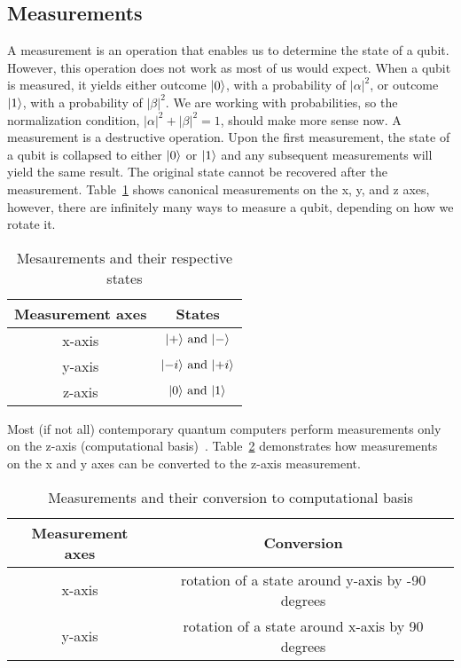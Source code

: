 \tocless\subsection{Measurements}\noindent
A measurement is an operation that enables us to determine the state of a qubit. However, this operation does not work as most of us would expect. When a qubit is measured, it yields either outcome $\lvert0\rangle$, with a probability of $\lvert \alpha \rvert^2$, or outcome $\lvert1\rangle$, with a probability of $\lvert \beta \rvert^2$. We are working with probabilities, so the normalization condition, $\lvert \alpha \rvert^2 + \lvert \beta \rvert^2 = 1$, should make more sense now. A measurement is a destructive operation. Upon the first measurement, the state of a qubit is collapsed to either $\lvert0\rangle$ or $\lvert1\rangle$ and any subsequent measurements will yield the same result. The original state cannot be recovered after the measurement. Table~\ref{tab:measurements-states} shows canonical measurements on the x, y, and z axes, however, there are infinitely many ways to measure a qubit, depending on how we rotate it.

\begin{table}[H]
  \centering
  \begin{tabular}{|c|c|} 
      \hline
      \multicolumn{1}{|c|}{\textbf{Measurement axes}} & \textbf{States}\\
      \hline
      x-axis & $\lvert+\rangle \text{ and }\lvert-\rangle$\\ 
      \hline
      y-axis & $\lvert-i\rangle \text{ and }\lvert+i\rangle$\\ 
      \hline
      z-axis & $\lvert0\rangle \text{ and }\lvert1\rangle$\\ 
      \hline
  \end{tabular}
  \caption{Mesaurements and their respective states}
  \label{tab:measurements-states}
\end{table}
Most (if not all) contemporary quantum computers perform measurements only on the z-axis (computational basis)~\cite{blog}. Table~\ref{tab:measurements-conversion} demonstrates how measurements on the x and y axes can be converted to the z-axis measurement.
\begin{table}[H]
  \centering
  \begin{tabular}{|c|c|} 
      \hline
      \multicolumn{1}{|c|}{\textbf{Measurement axes}} & \textbf{Conversion}\\
      \hline
      x-axis & rotation of a state around y-axis by -90 degrees \\ 
      \hline
      y-axis & rotation of a state around x-axis by 90 degrees \\ 
      \hline
  \end{tabular}
  \caption{Measurements and their conversion to computational basis}
  \label{tab:measurements-conversion}
\end{table}


